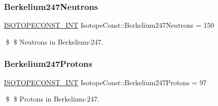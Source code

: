 \subsubsection{\texorpdfstring{Berkelium247\+Neutrons}{Berkelium247Neutrons}}
{\footnotesize\ttfamily \mbox{\hyperlink{group___isotope_const-_macros_ga5f18360b3e99483a35c32d789e62621c}{I\+S\+O\+T\+O\+P\+E\+C\+O\+N\+S\+T\+\_\+\+I\+NT}} Isotope\+Const\+::\+Berkelium247\+Neutrons = 150}

\$ \$ Neutrons in Berkelium-\/247. \mbox{\label{group___isotope_const-_berkelium-_bk247_gae31c71165b21362d55a1c1ae4fb8d152}} 
\subsubsection{\texorpdfstring{Berkelium247\+Protons}{Berkelium247Protons}}
{\footnotesize\ttfamily \mbox{\hyperlink{group___isotope_const-_macros_ga5f18360b3e99483a35c32d789e62621c}{I\+S\+O\+T\+O\+P\+E\+C\+O\+N\+S\+T\+\_\+\+I\+NT}} Isotope\+Const\+::\+Berkelium247\+Protons = 97}

\$ \$ Protons in Berkelium-\/247. 